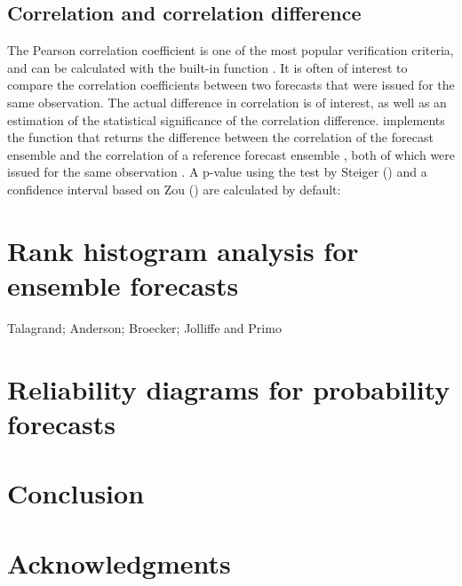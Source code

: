 \documentclass[article]{jss}
\begin{document}
\subsection{Correlation and correlation difference}

The Pearson correlation coefficient is one of the most popular verification criteria, and can be calculated with the built-in  function .
It is often of interest to compare the correlation coefficients between two forecasts that were issued for the same observation.
The actual difference in correlation is of interest, as well as an estimation of the statistical significance of the correlation difference.
 implements the function  that returns the difference between the correlation of the forecast ensemble  and the correlation of a reference forecast ensemble , both of which were issued for the same observation .
A p-value using the test by Steiger (\citep{steiger1980tests}) and a confidence interval based on Zou (\citet{zou2007toward}) are calculated by default:


\section{Rank histogram analysis for ensemble forecasts}

Talagrand; Anderson; Broecker; Jolliffe and Primo

\section{Reliability diagrams for probability forecasts}


\section{Conclusion}

\section*{Acknowledgments}



\end{document}
